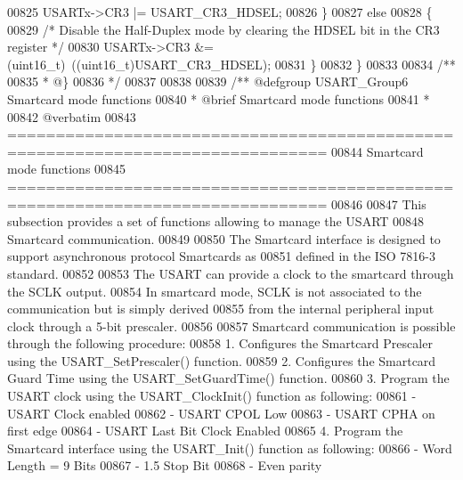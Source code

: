 \begin{DoxyCode}
00825     USARTx->CR3 |= USART_CR3_HDSEL;
00826   \}
00827   \textcolor{keywordflow}{else}
00828   \{
00829     \textcolor{comment}{/* Disable the Half-Duplex mode by clearing the HDSEL bit in the CR3 register */}
00830     USARTx->CR3 &= (uint16\_t)~((uint16\_t)USART_CR3_HDSEL);
00831   \}
00832 \}
00833 
00834 \textcolor{comment}{/**}
00835 \textcolor{comment}{  * @\}}
00836 \textcolor{comment}{  */}
00837 
00838 
00839 \textcolor{comment}{/** @defgroup USART\_Group6 Smartcard mode functions}
00840 \textcolor{comment}{ *  @brief   Smartcard mode functions }
00841 \textcolor{comment}{ *}
00842 \textcolor{comment}{@verbatim   }
00843 \textcolor{comment}{ ===============================================================================}
00844 \textcolor{comment}{                               Smartcard mode functions}
00845 \textcolor{comment}{ ===============================================================================  }
00846 \textcolor{comment}{}
00847 \textcolor{comment}{  This subsection provides a set of functions allowing to manage the USART }
00848 \textcolor{comment}{  Smartcard communication.}
00849 \textcolor{comment}{  }
00850 \textcolor{comment}{  The Smartcard interface is designed to support asynchronous protocol Smartcards as}
00851 \textcolor{comment}{  defined in the ISO 7816-3 standard.}
00852 \textcolor{comment}{}
00853 \textcolor{comment}{  The USART can provide a clock to the smartcard through the SCLK output.}
00854 \textcolor{comment}{  In smartcard mode, SCLK is not associated to the communication but is simply derived }
00855 \textcolor{comment}{  from the internal peripheral input clock through a 5-bit prescaler.}
00856 \textcolor{comment}{}
00857 \textcolor{comment}{  Smartcard communication is possible through the following procedure:}
00858 \textcolor{comment}{     1. Configures the Smartcard Prescaler using the USART\_SetPrescaler() function.}
00859 \textcolor{comment}{     2. Configures the Smartcard Guard Time using the USART\_SetGuardTime() function.}
00860 \textcolor{comment}{     3. Program the USART clock using the USART\_ClockInit() function as following:}
00861 \textcolor{comment}{        - USART Clock enabled}
00862 \textcolor{comment}{        - USART CPOL Low}
00863 \textcolor{comment}{        - USART CPHA on first edge}
00864 \textcolor{comment}{        - USART Last Bit Clock Enabled}
00865 \textcolor{comment}{     4. Program the Smartcard interface using the USART\_Init() function as following:}
00866 \textcolor{comment}{        - Word Length = 9 Bits}
00867 \textcolor{comment}{        - 1.5 Stop Bit}
00868 \textcolor{comment}{        - Even parity}

\end{DoxyCode}
